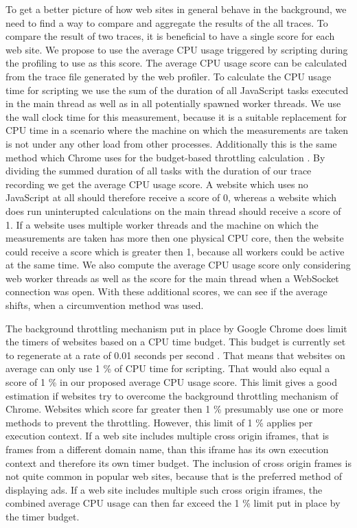 \documentclass[
	ruledheaders=section,%
	class=report,%
	thesis={type=bachelor},%
	accentcolor=9c,%
	custommargins=true,%
	marginpar=false,%
	parskip=half-,%
	fontsize=11pt,%
]{tudapub}
\begin{document}
  To get a better picture of how web sites in general behave in the background, we need to find a way to compare and aggregate the results of the all traces. To compare the result of two traces, it is beneficial to have a single score for each web site. We propose to use the average CPU usage triggered by scripting during the profiling to use as this score. The average CPU usage score can be calculated from the trace file generated by the web profiler. To calculate the CPU usage time for scripting we use the sum of the duration of all JavaScript tasks executed in the main thread as well as in all potentially spawned worker threads. We use the wall clock time for this measurement, because it is a suitable replacement for CPU time in a scenario where the machine on which the measurements are taken is not under any other load from other processes. Additionally this is the same method which Chrome uses for the budget-based throttling calculation \cite{chrome-background-tabs}. By dividing the summed duration of all tasks with the duration of our trace recording we get the average CPU usage score. A website which uses no JavaScript at all should therefore receive a score of 0, whereas a website which does run uninterupted calculations on the main thread should receive a score of 1. If a website uses multiple worker threads and the machine on which the measurements are taken has more then one physical CPU core, then the website could receive a score which is greater then 1, because all workers could be active at the same time. We also compute the average CPU usage score only considering web worker threads as well as the score for the main thread when a WebSocket connection was open. With these additional scores, we can see if the average shifts, when a circumvention method was used.

  The background throttling mechanism put in place by Google Chrome does limit the timers of websites based on a CPU time budget. This budget is currently set to regenerate at a rate of 0.01 seconds per second \cite{chrome-background-tabs}. That means that websites on average can only use 1 \% of CPU time for scripting. That would also equal a score of 1 \% in our proposed average CPU usage score. This limit gives a good estimation if websites try to overcome the background throttling mechanism of Chrome. Websites which score far greater then 1 \% presumably use one or more methods to prevent the throttling. However, this limit of 1 \% applies per execution context. If a web site includes multiple cross origin iframes, that is frames from a different domain name, than this iframe has its own execution context and therefore its own timer budget. The inclusion of cross origin frames is not quite common in popular web sites, because that is the preferred method of displaying ads. If a web site includes multiple such cross origin iframes, the combined average CPU usage can then far exceed the 1 \% limit put in place by the timer budget.
\end{document}
